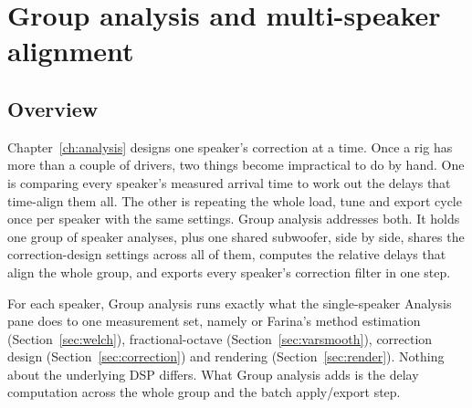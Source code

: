 \chapter{Group analysis and multi-speaker alignment}\label{ch:groupanalysis}

\section{Overview}
Chapter~\ref{ch:analysis} designs one speaker's correction at a time. Once a rig has more than a couple of drivers, two things become impractical to do by hand. One is comparing every speaker's measured arrival time to work out the delays that time-align them all. The other is repeating the whole load, tune and export cycle once per speaker with the same settings. Group analysis addresses both. It holds one group of speaker analyses, plus one shared subwoofer, side by side, shares the correction-design settings across all of them, computes the relative delays that align the whole group, and exports every speaker's correction filter in one step.

For each speaker, Group analysis runs exactly what the single-speaker Analysis pane does to one measurement set, namely  or Farina's method estimation (Section~\ref{sec:welch}), fractional-octave  (Section~\ref{sec:varsmooth}), correction design (Section~\ref{sec:correction}) and  rendering (Section~\ref{sec:render}). Nothing about the underlying DSP differs. What Group analysis adds is the delay computation across the whole group and the batch apply/export step.


